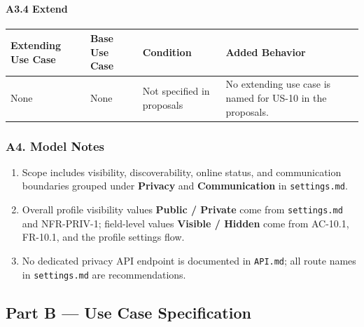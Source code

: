 \documentclass[12pt]{article}
\renewcommand{\baselinestretch}{1.5}
\begin{document}
\hypertarget{sec:a3-4-extend}{}
\paragraph*{A3.4 Extend}
\par\medskip

\begingroup
\small
\renewcommand{\baselinestretch}{1.0}\selectfont
\renewcommand{\arraystretch}{1.15}
\setlength{\tabcolsep}{6pt}
\begin{longtable}{|>{\raggedright\arraybackslash}p{}|>{\raggedright\arraybackslash}p{}|>{\raggedright\arraybackslash}p{}|>{\raggedright\arraybackslash}p{}|}
\hline
\textbf{Extending Use Case} & \textbf{Base Use Case} & \textbf{Condition} & \textbf{Added Behavior} \\ \hline
\endhead
None & None & Not specified in proposals & No extending use case is named for US-10 in the proposals. \\ \hline
\end{longtable}
\endgroup
\par\medskip

\hypertarget{sec:a4-model-notes}{}
\subsubsection*{A4. Model Notes}
\par\medskip

\begin{enumerate}
\item Scope includes visibility, discoverability, online status, and communication boundaries grouped under \textbf{Privacy} and \textbf{Communication} in \texttt{settings.md}.
\item Overall profile visibility values \textbf{Public / Private} come from \texttt{settings.md} and NFR-PRIV-1; field-level values \textbf{Visible / Hidden} come from AC-10.1, FR-10.1, and the profile settings flow.
\item No dedicated privacy API endpoint is documented in \texttt{API.md}; all route names in \texttt{settings.md} are recommendations.
\end{enumerate}
\par\medskip

\hypertarget{sec:part-b-use-case-specification}{}
\subsection*{Part B --- Use Case Specification}
\par\medskip
\end{document}
